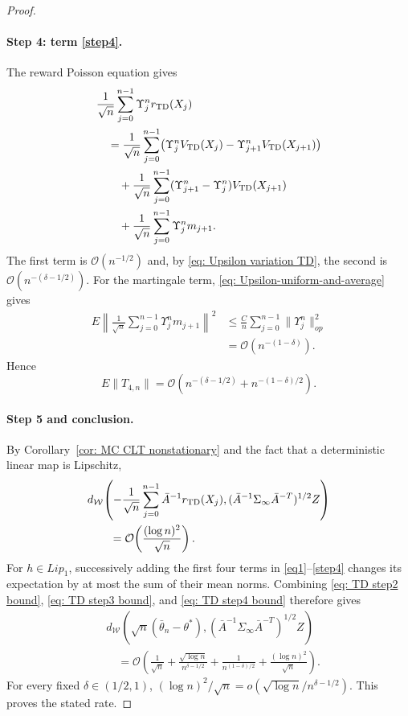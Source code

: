 \documentclass[11pt]{article}
\begin{document}
\begin{proof}
\paragraph{Step 4: term \eqref{step4}.}
The reward Poisson equation gives
\begin{align*}
&\frac1{\sqrt n}\sum_{j=0}^{n-1}\Upsilon_j^n r_{\rm TD}(X_j)\\
&\quad=
\frac1{\sqrt n}\sum_{j=0}^{n-1}
\bigl(\Upsilon_j^nV_{\rm TD}(X_j)
-\Upsilon_{j+1}^nV_{\rm TD}(X_{j+1})\bigr)\\
&\qquad+
\frac1{\sqrt n}\sum_{j=0}^{n-1}
(\Upsilon_{j+1}^n-\Upsilon_j^n)V_{\rm TD}(X_{j+1})\\
&\qquad+
\frac1{\sqrt n}\sum_{j=0}^{n-1}\Upsilon_j^n m_{j+1}.
\end{align*}
The first term is $\mathcal O(n^{-1/2})$ and, by
\eqref{eq: Upsilon variation TD}, the second is
$\mathcal O(n^{-(\delta-1/2)})$. For the martingale term,
\eqref{eq: Upsilon-uniform-and-average} gives
\begin{align*}
E\left\|
\frac1{\sqrt n}\sum_{j=0}^{n-1}\Upsilon_j^n m_{j+1}
\right\|^2
&\leq
\frac Cn\sum_{j=0}^{n-1}\|\Upsilon_j^n\|_{op}^2\\
&=
\mathcal O\!\left(n^{-(1-\delta)}\right).
\end{align*}
Hence
\begin{equation}\label{eq: TD step4 bound}
    E\|T_{4,n}\|
    =
    \mathcal O\!\left(
        n^{-(\delta-1/2)}+n^{-(1-\delta)/2}
    \right).
\end{equation}

\paragraph{Step 5 and conclusion.}
By Corollary~\ref{cor: MC CLT nonstationary} and the fact that a deterministic
linear map is Lipschitz,
\begin{align*}
&d_\mathcal W\!\left(
-
\frac1{\sqrt n}\sum_{j=0}^{n-1}\bar A^{-1}r_{\rm TD}(X_j),
(\bar A^{-1}\Sigma_\infty\bar A^{-T})^{1/2}Z
\right)\\
&\qquad=
\mathcal O\!\left(\frac{(\log n)^2}{\sqrt n}\right).
\end{align*}
For $h\in Lip_1$, successively adding the first four terms in
\eqref{eq1}--\eqref{step4} changes its expectation by at most the sum of their
mean norms. Combining \eqref{eq: TD step2 bound},
\eqref{eq: TD step3 bound}, and \eqref{eq: TD step4 bound} therefore gives
\begin{align*}
&d_\mathcal W\!\left(
\sqrt n(\bar\theta_n-\theta^*),
(\bar A^{-1}\Sigma_\infty\bar A^{-T})^{1/2}Z
\right)\\
&\quad=
\mathcal O\!\left(
\frac1{\sqrt n}
+
\frac{\sqrt{\log n}}{n^{\delta-1/2}}
+
\frac1{n^{(1-\delta)/2}}
+
\frac{(\log n)^2}{\sqrt n}
\right).
\end{align*}
For every fixed $\delta\in(1/2,1)$,
$(\log n)^2/\sqrt n=o(\sqrt{\log n}/n^{\delta-1/2})$. This proves the
stated rate.
\end{proof}
\end{document}
